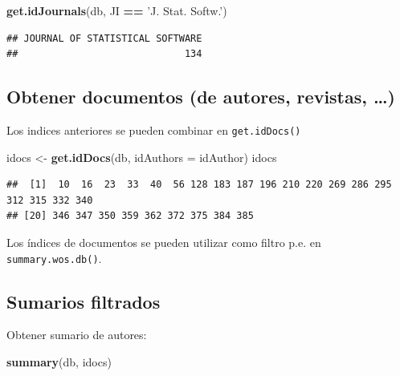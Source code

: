 \documentclass[
]{book}
\newenvironment{Shaded}{\begin{snugshade}}{\end{snugshade}}
\newcommand{\DataTypeTok}[1]{\textcolor[rgb]{0.13,0.29,0.53}{#1}}
\newcommand{\KeywordTok}[1]{\textcolor[rgb]{0.13,0.29,0.53}{\textbf{#1}}}
\newcommand{\NormalTok}[1]{#1}
\newcommand{\OperatorTok}[1]{\textcolor[rgb]{0.81,0.36,0.00}{\textbf{#1}}}
\newcommand{\StringTok}[1]{\textcolor[rgb]{0.31,0.60,0.02}{#1}}
\begin{document}
\begin{itemize}
\begin{Shaded}
\begin{Highlighting}[]
\KeywordTok{get.idJournals}\NormalTok{(db, JI }\OperatorTok{==}\StringTok{ 'J. Stat. Softw.'}\NormalTok{)}
\end{Highlighting}
\end{Shaded}

\begin{verbatim}
## JOURNAL OF STATISTICAL SOFTWARE 
##                             134
\end{verbatim}
\end{itemize}

\hypertarget{obtener-documentos-de-autores-revistas}{%
\subsection{Obtener documentos (de autores, revistas, \ldots)}\label{obtener-documentos-de-autores-revistas}}

Los indices anteriores se pueden combinar en \texttt{get.idDocs()}

\begin{Shaded}
\begin{Highlighting}[]
\NormalTok{idocs <-}\StringTok{ }\KeywordTok{get.idDocs}\NormalTok{(db, }\DataTypeTok{idAuthors =}\NormalTok{ idAuthor)}
\NormalTok{idocs}
\end{Highlighting}
\end{Shaded}

\begin{verbatim}
##  [1]  10  16  23  33  40  56 128 183 187 196 210 220 269 286 295 312 315 332 340
## [20] 346 347 350 359 362 372 375 384 385
\end{verbatim}

Los índices de documentos se pueden utilizar como filtro p.e. en \texttt{summary.wos.db()}.

\hypertarget{sumarios-filtrados}{%
\subsection{Sumarios filtrados}\label{sumarios-filtrados}}

Obtener sumario de autores:

\begin{Shaded}
\begin{Highlighting}[]
\KeywordTok{summary}\NormalTok{(db, idocs)}
\end{Highlighting}
\end{Shaded}
\end{document}

